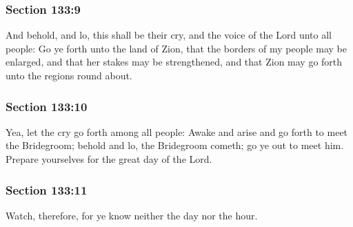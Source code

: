 	\subsubsection{Section 133:9} %
		\label{DC133-9}

		And behold, and lo, this shall be their cry, and the voice of the Lord unto all people: Go ye forth unto the land of Zion, that the borders of my people may be enlarged, and that her stakes may be strengthened, and that Zion may go forth unto the regions round about.


	\subsubsection{Section 133:10} %
		\label{DC133-10}

		Yea, let the cry go forth among all people: Awake and arise and go forth to meet the Bridegroom; behold and lo, the Bridegroom cometh; go ye out to meet him.  Prepare yourselves for the great day of the Lord.


	\subsubsection{Section 133:11} %
		\label{DC133-11}

		Watch, therefore, for ye know neither the day nor the hour.


